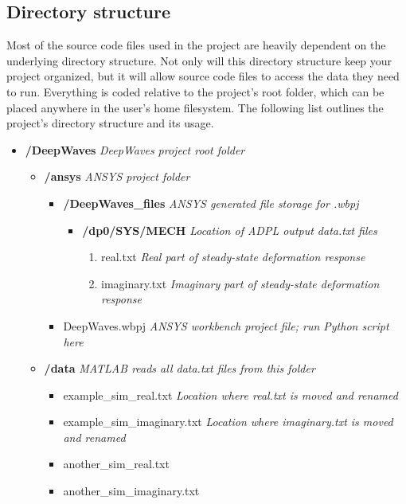 \documentclass[11pt,letterpaper]{article}
\begin{document}
		\subsection{Directory structure}
		Most of the source code files used in the project are heavily dependent on the underlying directory structure. Not only will this directory structure keep your project organized, but it will allow source code files to access the data they need to run. Everything is coded relative to the project's root folder, which can be placed anywhere in the user's home filesystem. The following list outlines the project's directory structure and its usage.
		\begin{itemize}
			\item[] \textbf{/DeepWaves} \hfill \textit{DeepWaves project root folder}
			\begin{itemize}
				\item[] \textbf{/ansys} \hfill \textit{ANSYS project folder}
				\begin{itemize}
					\item[] \textbf{/DeepWaves\_files} \hfill \textit{ANSYS generated file storage for .wbpj}
					\begin{itemize}
						\item[] \textbf{/dp0/SYS/MECH} \hfill \textit{Location of ADPL output data.txt files}
						\begin{enumerate}
							\item[] real.txt \hfill \textit{Real part of steady-state deformation response}
							\item[] imaginary.txt \hfill \textit{Imaginary part of steady-state deformation response}
						\end{enumerate}
					\end{itemize}
					\item[] DeepWaves.wbpj \hfill \textit{ANSYS workbench project file; run Python script here}
				\end{itemize}
				\item[] \textbf{/data} \hfill \textit{MATLAB reads all data.txt files from this folder}
				\begin{itemize}
					\item[] example\_sim\_real.txt \hfill \textit{Location where real.txt is moved and renamed}
					\item[] example\_sim\_imaginary.txt \hfill \textit{Location where imaginary.txt is moved and renamed}
					\item[] another\_sim\_real.txt
					\item[] another\_sim\_imaginary.txt

\end{itemize}
\end{itemize}
\end{itemize}
\end{document}
